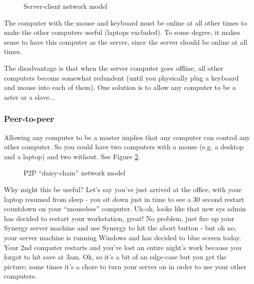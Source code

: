 \begin{figure}[ht!]
  \centering
  
  \caption{Server-client network model}
  \label{fig:serverClient}
\end{figure}

The computer with the mouse and keyboard must be online at all other times to
make the other computers useful (laptops excluded). To some degree, it makes 
sense to have this computer as the server, since the server should be online
at all times.

The disadvantage is that when the server computer goes offline, all other 
computers become somewhat redundent (until you physically plug a keyboard
and mouse into each of them). One solution is to allow any computer to be a 
aster or a slave...

\subsubsection{Peer-to-peer}


Allowing any computer to be a master implies that any computer can control
any other computer. So you could have two computers with a mouse (e.g. a 
desktop and a laptop) and two without. See Figure \ref{fig:p2p}.

\begin{figure}[ht!]
  \centering
  
  \caption{P2P ``daisy-chain'' network model}
  \label{fig:p2p}
\end{figure}


Why might this be useful? Let's say you've just arrived at the
office, with your laptop resumed from sleep - you sit down just in time to see
a 30 second restart countdown on your ``mouseless'' computer. Uh-oh, looks like
that new sys admin has decided to restart your workstation, great! No problem, 
just fire up your Synergy server machine and use Synergy to hit the abort 
button - but oh no, your server machine is running Windows and has decided to 
blue screen today. Your 2nd computer restarts and you've lost an entire night's
work because you forgot to hit save at 3am. Ok, so it's a bit of an edge-case
but you get the picture; some times it's a chore to turn your server on in
order to use your other computers.

